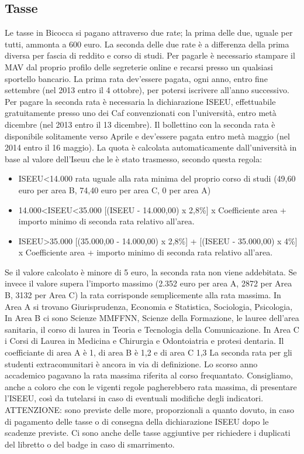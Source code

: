 \subsection{Tasse}

Le tasse in Bicocca si pagano attraverso due rate; la prima delle due, uguale per tutti, ammonta a 600 euro. La seconda delle due rate è a differenza della prima diversa per fascia di reddito e corso di studi.
Per pagarle è necessario stampare il MAV dal proprio profilo delle segreterie online e recarsi presso un qualsiasi sportello bancario. La prima rata dev'essere pagata, ogni anno, entro fine settembre (nel 2013 entro il 4 ottobre), per potersi iscrivere all'anno successivo. Per pagare la seconda rata è necessaria la dichiarazione ISEEU, effettuabile gratuitamente presso uno dei Caf convenzionati con l'università, entro metà dicembre (nel 2013 entro il 13 dicembre). 
Il bollettino con la seconda rata è disponibile solitamente verso Aprile e dev'essere pagata entro metà maggio (nel 2014 entro il 16 maggio). La quota è calcolata automaticamente dall'università in base al valore dell'Iseuu che le è stato trasmesso, secondo questa regola: 
\begin{itemize}
\item ISEEU<14.000 rata uguale alla rata minima del proprio corso di studi (49,60 euro per area B, 74,40 euro per area C, 0 per area A) 
\item 14.000<ISEEU<35.000 [(ISEEU - 14.000,00) x 2,8\%] x Coefficiente area + importo minimo di seconda rata relativo all'area. 
\item ISEEU>35.000 {[(35.000,00 - 14.000,00) x 2,8\%] + [(ISEEU - 35.000,00) x 4\%]} x Coefficiente area + importo minimo di seconda rata relativo all'area. 
\end{itemize}
Se il valore calcolato è minore di 5 euro, la seconda rata non viene addebitata. Se invece il valore supera l'importo massimo (2.352 euro per area A, 2872 per Area B, 3132 per Area C) la rata corrisponde semplicemente alla rata massima. In Area A si trovano Giurisprudenza, Economia e Statistica, Sociologia, Psicologia, In Area B ci sono Scienze MMFFNN, Scienze della Formazione, le lauree dell'area sanitaria, il corso di laurea in Teoria e Tecnologia della Comunicazione. In Area C i Corsi di Laurea in Medicina e Chirurgia e Odontoiatria e protesi dentaria.
Il coefficiante di area A è 1, di area B è 1,2 e di area C 1,3
La seconda rata per gli studenti extracomunitari è ancora in via di definizione. Lo scorso anno accademico pagavano la rata massima riferita al corso frequantato. Consigliamo, anche a coloro che con le vigenti regole pagherebbero rata massima, di presentare l'ISEEU, così da tutelarsi in caso di eventuali modifiche degli indicatori.
ATTENZIONE: sono previste delle more, proporzionali a quanto dovuto, in caso di pagamento delle tasse o di consegna della dichiarazione ISEEU dopo le scadenze previste. Ci sono anche delle tasse aggiuntive per richiedere i duplicati del libretto o del badge in caso di smarrimento.
 
